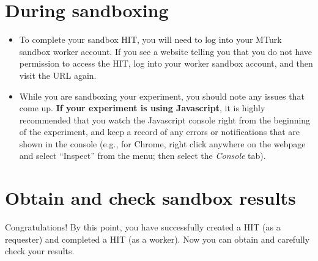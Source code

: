 \documentclass{article}
\begin{document}
\section{During sandboxing}

\begin{itemize}
  \item To complete your sandbox HIT, you will need to log into your MTurk sandbox worker account. If you see a website telling you that you do not have permission to access the HIT, log into your worker sandbox account, and then visit the URL again.
  \item While you are sandboxing your experiment, you should note any issues that come up. \textbf{If your experiment is using Javascript}, it is highly recommended that you watch the Javascript console right from the beginning of the experiment, and keep a record of any errors or notifications that are shown in the console (e.g., for Chrome, right click anywhere on the webpage and select ``Inspect'' from the menu; then select the {\it Console} tab). 

\end{itemize}


\section{Obtain and check sandbox results}

Congratulations! By this point, you have successfully created a HIT (as a requester) and completed a HIT (as a worker). Now you can obtain and carefully check your results. 
\end{document}
